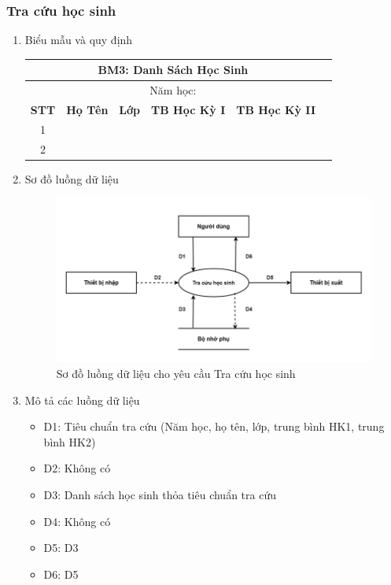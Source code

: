 \documentclass[a4paper]{article}
\begin{document}
	\subsubsection{Tra cứu học sinh}
	\begin{enumerate}[label=\alph*.]
\item Biểu mẫu và quy định

\begin{table}[H]
    \centering
    \renewcommand{\arraystretch}{1.5}
    \setlength{\tabcolsep}{12pt} %
    \begin{tabular}{|c|c|c|c|c|c|}
    \hline
    \multicolumn{5}{|c|}{\textbf{BM3: Danh Sách Học Sinh}} \\  
    \hline
    
   \multicolumn{5}{|c|}{Năm học: \dotfill} \\  
   \hline
    
    \textbf{STT} & \textbf{Họ Tên} & \textbf{Lớp} & \textbf{TB Học Kỳ I} & \textbf{TB Học Kỳ II} \\  
    \hline
    1 & & & & \\  
    \hline
    2 & & & & \\  
    \hline
    \end{tabular}
\end{table}


\item Sơ đồ luồng dữ liệu
\begin{figure}[H] 
    \centering
    \includegraphics[width=1\textwidth]{dfd3} %
    \caption{Sơ đồ luồng dữ liệu cho yêu cầu Tra cứu học sinh }
    \label{fig:example} %
\end{figure}	
\item Mô tả các luồng dữ liệu
\begin{itemize}
\item D1: Tiêu chuẩn tra cứu (Năm học, họ tên, lớp, trung bình HK1, trung bình HK2)
\item D2: Không có
\item D3: Danh sách học sinh thỏa tiêu chuẩn tra cứu
\item D4: Không có
\item D5: D3
\item D6: D5
\end{itemize}



\end{enumerate}
\end{document}

